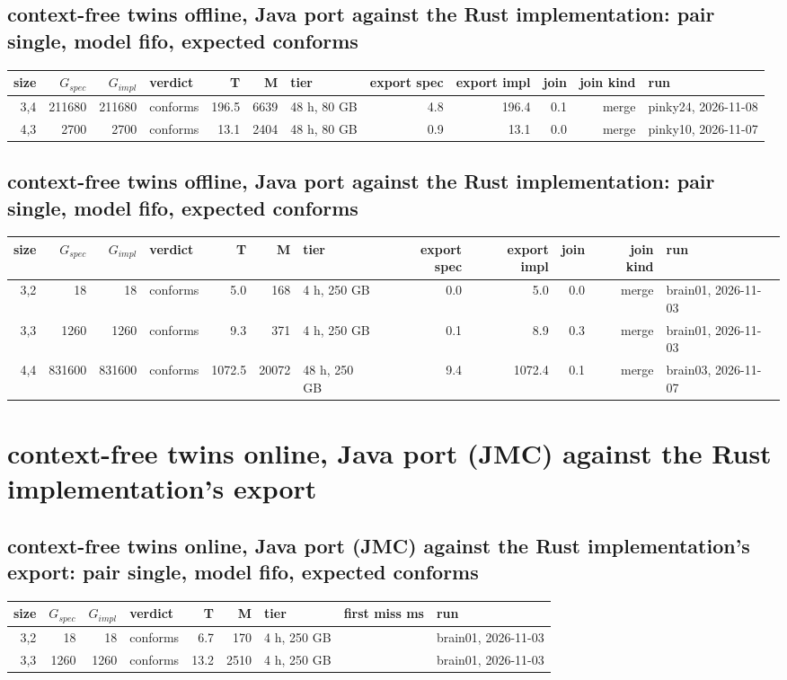 \documentclass[10pt]{article}
\begin{document}
\subsection*{context-free twins offline, Java port against the Rust implementation: pair \textsf{single}, model fifo, expected conforms}
\begin{longtable}{@{}rrrlrrlrrrrl@{}}
\toprule
size & $G_{\mathit{spec}}$ & $G_{\mathit{impl}}$ & verdict & T & M & tier & export spec & export impl & join & join kind & run \\
\midrule
\endhead
\color{red} 3,4 & 211680 & 211680 & conforms & 196.5 & 6639 & 48 h, 80 GB & 4.8 & 196.4 & 0.1 & merge & pinky24, 2026-11-08 \\
\color{red} 4,3 & 2700 & 2700 & conforms & 13.1 & 2404 & 48 h, 80 GB & 0.9 & 13.1 & 0.0 & merge & pinky10, 2026-11-07 \\
\bottomrule
\end{longtable}
\subsection*{context-free twins offline, Java port against the Rust implementation: pair \textsf{single}, model fifo, expected conforms}
\begin{longtable}{@{}rrrlrrlrrrrl@{}}
\toprule
size & $G_{\mathit{spec}}$ & $G_{\mathit{impl}}$ & verdict & T & M & tier & export spec & export impl & join & join kind & run \\
\midrule
\endhead
\color{blue} 3,2 & 18 & 18 & conforms & 5.0 & 168 & 4 h, 250 GB & 0.0 & 5.0 & 0.0 & merge & brain01, 2026-11-03 \\
\color{blue} 3,3 & 1260 & 1260 & conforms & 9.3 & 371 & 4 h, 250 GB & 0.1 & 8.9 & 0.3 & merge & brain01, 2026-11-03 \\
\color{blue} 4,4 & 831600 & 831600 & conforms & 1072.5 & 20072 & 48 h, 250 GB & 9.4 & 1072.4 & 0.1 & merge & brain03, 2026-11-07 \\
\bottomrule
\end{longtable}
\section*{context-free twins online, Java port (JMC) against the Rust implementation's export}
\subsection*{context-free twins online, Java port (JMC) against the Rust implementation's export: pair \textsf{single}, model fifo, expected conforms}
\begin{longtable}{@{}rrrlrrlrl@{}}
\toprule
size & $G_{\mathit{spec}}$ & $G_{\mathit{impl}}$ & verdict & T & M & tier & first miss ms & run \\
\midrule
\endhead
\color{blue} 3,2 & 18 & 18 & conforms & 6.7 & 170 & 4 h, 250 GB &  & brain01, 2026-11-03 \\
\color{blue} 3,3 & 1260 & 1260 & conforms & 13.2 & 2510 & 4 h, 250 GB &  & brain01, 2026-11-03 \\
\bottomrule
\end{longtable}
\end{document}

